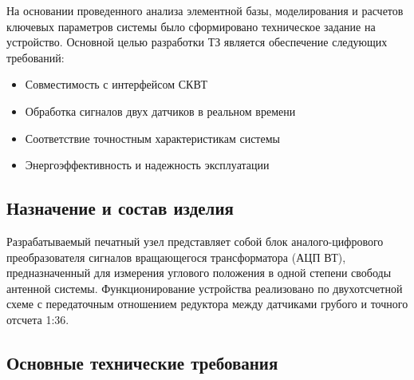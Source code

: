 На основании проведенного анализа элементной базы, моделирования и расчетов ключевых параметров системы было сформировано техническое задание на устройство. 
Основной целью разработки ТЗ является обеспечение следующих требований:
\begin{itemize}
    \item Совместимость с интерфейсом СКВТ 
    \item Обработка сигналов двух датчиков в реальном времени
    \item Соответствие точностным характеристикам системы
    \item Энергоэффективность и надежность эксплуатации
\end{itemize}

\subsection{Назначение и состав изделия}
Разрабатываемый печатный узел представляет собой блок аналого-цифрового преобразователя сигналов вращающегося трансформатора (АЦП ВТ), 
предназначенный для измерения углового положения в одной степени свободы антенной системы. Функционирование устройства реализовано по двухотсчетной 
схеме с передаточным отношением редуктора между датчиками грубого и точного отсчета 1:36.

\subsection{Основные технические требования}

